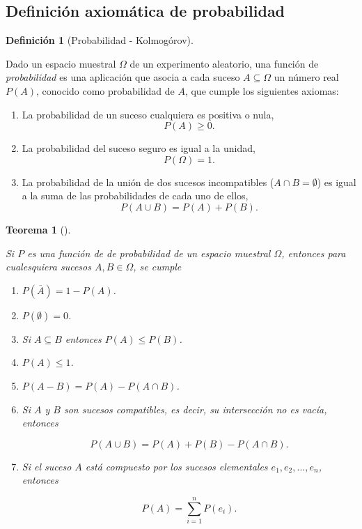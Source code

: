 \documentclass[
  a4paper,
]{scrreport}
\providecommand{\tightlist}{%
  \setlength{\itemsep}{0pt}\setlength{\parskip}{0pt}}\usepackage{longtable,booktabs,array}
\theoremstyle{plain}
\newtheorem{theorem}{Teorema}[chapter]
\theoremstyle{definition}
\newtheorem{definition}{Definición}[chapter]
\theoremstyle{definition}
\theoremstyle{remark}
\begin{document}
\subsection{Definición axiomática de
probabilidad}\label{definiciuxf3n-axiomuxe1tica-de-probabilidad}

\begin{definition}[Probabilidad -
Kolmogórov]\protect\hypertarget{def-probabilidad-kolmogorov}{}\label{def-probabilidad-kolmogorov}

Dado un espacio muestral \(\Omega\) de un experimento aleatorio, una
función de \emph{probabilidad} es una aplicación que asocia a cada
suceso \(A\subseteq \Omega\) un número real \(P(A)\), conocido como
probabilidad de \(A\), que cumple los siguientes axiomas:

\begin{enumerate}
\def\labelenumi{\arabic{enumi}.}
\tightlist
\item
  La probabilidad de un suceso cualquiera es positiva o nula,
  \[P(A)\geq 0.\]
\item
  La probabilidad del suceso seguro es igual a la unidad,
  \[P(\Omega)=1.\]
\item
  La probabilidad de la unión de dos sucesos incompatibles
  (\(A\cap B=\emptyset\)) es igual a la suma de las probabilidades de
  cada uno de ellos, \[P(A\cup B) = P(A)+P(B).\]
\end{enumerate}

\end{definition}

\begin{theorem}[]\protect\hypertarget{thm-consecuencias-axiomas-probabilidad}{}\label{thm-consecuencias-axiomas-probabilidad}

Si \(P\) es una función de de probabilidad de un espacio muestral
\(\Omega\), entonces para cualesquiera sucesos \(A, B\in \Omega\), se
cumple

\begin{enumerate}
\def\labelenumi{\arabic{enumi}.}
\item
  \(P(\overline A) = 1-P(A)\).
\item
  \(P(\emptyset)= 0\).
\item
  Si \(A\subseteq B\) entonces \(P(A)\leq P(B)\).
\item
  \(P(A) \leq 1\).
\item
  \(P(A-B) = P(A)-P(A\cap B)\).
\item
  Si \(A\) y \(B\) son sucesos compatibles, es decir, su intersección no
  es vacía, entonces

  \[P(A\cup B)= P(A) + P(B) - P(A\cap B).\]
\item
  Si el suceso \(A\) está compuesto por los sucesos elementales
  \(e_1,e_2,...,e_n\), entonces

  \[P(A)=\sum_{i=1}^n P(e_i).\]
\end{enumerate}

\end{theorem}
\end{document}
